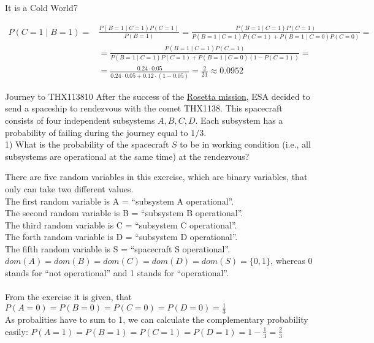 \begin{questions}
\begin{question}{It is a Cold World}{7}
\begin{answer}
\begin{equation*}
\begin{split}
P(C=1\mid B=1) = 
& \frac{P(B=1\mid C=1) P(C=1)}{P(B=1)} = \frac{P(B=1\mid C=1) P(C=1)}{P(B=1\mid C=1) P(C=1)+P(B=1\mid C=0) P(C=0)} =\\
& = \frac{P(B=1\mid C=1) P(C=1)}{P(B=1\mid C=1) P(C=1)+P(B=1\mid C=0) (1-P(C=1))} =\\ 
&= \frac{0.24\cdot0.05}{0.24\cdot0.05+0.12\cdot(1-0.05)} = \frac{2}{21} \approx 0.0952
\end{split}
\end{equation*}
\end{answer}
\end{question}



\begin{question}{Journey to THX1138}{10}
	After the success of the \href{http://rosetta.esa.int/}{Rosetta mission}, ESA decided to send a spaceship to rendezvous with the comet THX1138. 
	This spacecraft consists of four independent subsystems $A,B,C,D$. 
	Each subsystem has a probability of failing during the journey equal to $1/3$. 
	\\
	1) What is the probability of the spacecraft $S$ to be in working condition (i.e., all subsystems are operational at the same time) at the rendezvous?
	\\
\begin{answer}
There are five random variables in this exercise, which are binary variables, that only can take two different values. \\
The first random variable is A = ``subsystem A operational''.\\
The second random variable is B = ``subsystem B operational''.\\
The third random variable is C = ``subsystem C operational''.\\
The forth random variable is D = ``subsystem D operational''.\\
The fifth random variable is S = ``spacecraft S operational''.\\
$dom(A) = dom(B) = dom(C) = dom(D) = dom(S) = \{0,1\}$, whereas 0 stands for ``not operational'' and 1 stands for ``operational''.\\ \\
From the exercise it is given, that $P(A=0)=P(B=0)=P(C=0)=P(D=0)= \frac{1}{3}$\\
As probalities have to sum to 1, we can calculate the complementary probability easily: $P(A=1)=P(B=1)=P(C=1)=P(D=1)= 1- \frac{1}{3}=\frac{2}{3}$\\ \\

\end{answer}
\end{question}
\end{questions}
